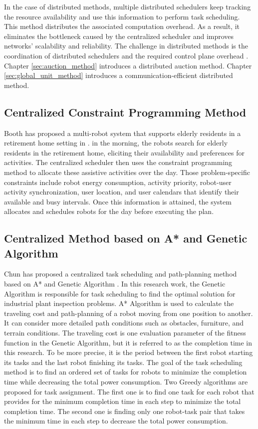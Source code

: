 In the case of distributed methods, multiple distributed schedulers keep tracking the resource availability and use this information to perform task scheduling\cite{CHRISTODOULOPOULOS20091172}. This method distributes the associated computation overhead. As a result, it eliminates the bottleneck caused by the centralized scheduler and improves networks' scalability and reliability. The challenge in distributed methods is the coordination of distributed schedulers and the required control plane overhead \cite{CHRISTODOULOPOULOS20091172}.
Chapter \ref{sec:auction_method} introduces a distributed auction method. Chapter \ref{sec:global_unit_method} introduces a communication-efficient distributed method. 

\subsection{Centralized Constraint Programming Method}
\label{sec:constraint_programming}
Booth has proposed a multi-robot system that supports elderly residents in a retirement home setting in \cite{retire2017}. in the morning, the robots search for elderly residents in the retirement home, eliciting their availability and preferences for activities. The centralized scheduler then uses the constraint programming method to allocate these assistive activities over the day. Those problem-specific constraints include robot energy consumption, activity priority, robot-user activity synchronization, user location, and user calendars that identify their available and busy intervals. Once this information is attained, the system allocates and schedules robots for the day before executing the plan.

\subsection{Centralized Method based on A* and Genetic Algorithm}
\label{sec:genetic_method}
Chun has proposed a centralized task scheduling and path-planning method based on A* and Genetic Algorithm \cite{Chun12}. In this research work, the Genetic Algorithm is responsible for task scheduling to find the optimal solution for industrial plant inspection problems. A* Algorithm is used to calculate the traveling cost and path-planning of a robot moving from one position to another. It can consider more detailed path conditions such as obstacles, furniture, and terrain conditions. The traveling cost is one evaluation parameter of the fitness function in the Genetic Algorithm, but it is referred to as the completion time in this research. To be more precise, it is the period between the first robot starting its tasks and the last robot finishing its tasks.
The goal of the task scheduling method is to find an ordered set of tasks for robots to minimize the completion time while decreasing the total power consumption.
Two Greedy algorithms are proposed for task assignment. The first one is to find one task for each robot that provides for the minimum completion time in each step to minimize the total completion time. The second one is finding only one robot-task pair that takes the minimum time in each step to decrease the total power consumption. 

